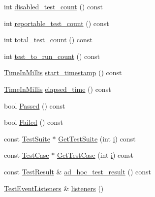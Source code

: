\begin{DoxyCompactItemize}
\item 
int \mbox{\hyperlink{classtesting_1_1_unit_test_ad69ccf3d4a9bc7333badeafbde3bc76b}{disabled\+\_\+test\+\_\+count}} () const
\item 
int \mbox{\hyperlink{classtesting_1_1_unit_test_a449d0e0350ef146040cd37679c005248}{reportable\+\_\+test\+\_\+count}} () const
\item 
int \mbox{\hyperlink{classtesting_1_1_unit_test_af6e02fcf76fd7247687f4e8af6e7ef41}{total\+\_\+test\+\_\+count}} () const
\item 
int \mbox{\hyperlink{classtesting_1_1_unit_test_a461f46b2976f135d2a65e8d3def746e9}{test\+\_\+to\+\_\+run\+\_\+count}} () const
\item 
\mbox{\hyperlink{namespacetesting_a992de1d091ce660f451d1e8b3ce30fd6}{Time\+In\+Millis}} \mbox{\hyperlink{classtesting_1_1_unit_test_ab6dc32e9f385f164df02899b2b440f04}{start\+\_\+timestamp}} () const
\item 
\mbox{\hyperlink{namespacetesting_a992de1d091ce660f451d1e8b3ce30fd6}{Time\+In\+Millis}} \mbox{\hyperlink{classtesting_1_1_unit_test_a410e14e52f505dabe2054e5018e9ca33}{elapsed\+\_\+time}} () const
\item 
bool \mbox{\hyperlink{classtesting_1_1_unit_test_a7c9b327bc14cb8a282c789dc6513a55b}{Passed}} () const
\item 
bool \mbox{\hyperlink{classtesting_1_1_unit_test_a706f29e765916616b11a271a65948727}{Failed}} () const
\item 
const \mbox{\hyperlink{classtesting_1_1_test_suite}{Test\+Suite}} $\ast$ \mbox{\hyperlink{classtesting_1_1_unit_test_a906e19e244ccc129bcc62fe2f3632e1c}{Get\+Test\+Suite}} (int \mbox{\hyperlink{_obj__test_2lib_2googletest-master_2googlemock_2test_2gmock-matchers__test_8cc_acb559820d9ca11295b4500f179ef6392}{i}}) const
\item 
const \mbox{\hyperlink{classtesting_1_1_test_case}{Test\+Case}} $\ast$ \mbox{\hyperlink{classtesting_1_1_unit_test_adf55eb1cc81a43d40ddef75fadded1de}{Get\+Test\+Case}} (int \mbox{\hyperlink{_obj__test_2lib_2googletest-master_2googlemock_2test_2gmock-matchers__test_8cc_acb559820d9ca11295b4500f179ef6392}{i}}) const
\item 
const \mbox{\hyperlink{classtesting_1_1_test_result}{Test\+Result}} \& \mbox{\hyperlink{classtesting_1_1_unit_test_afb26f53c070675638033436f35bad889}{ad\+\_\+hoc\+\_\+test\+\_\+result}} () const
\item 
\mbox{\hyperlink{classtesting_1_1_test_event_listeners}{Test\+Event\+Listeners}} \& \mbox{\hyperlink{classtesting_1_1_unit_test_a1b7387b0b3daa2433ed6b685027bf285}{listeners}} ()

\end{DoxyCompactItemize}
